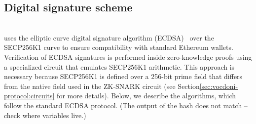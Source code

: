 \subsection{Digital signature scheme}
\label{sec:cryptographic-primitives:signatures}

{}\\

\noi \Davinci uses the {elliptic curve digital signature algorithm} (ECDSA)~\cite{johnson2001ecdsa} over the SECP256K1 curve to ensure compatibility with standard Ethereum wallets. %
%
%
Verification of ECDSA signatures is performed inside zero-knowledge proofs using a specialized circuit that emulates SECP256K1 arithmetic. This approach is necessary because SECP256K1 is defined over a 256-bit prime field that differs from the native field used in the ZK-SNARK circuit (see Section\ref{sec:vocdoni-protocol:circuits} for more details). Below, we describe the algorithms, which follow the standard ECDSA protocol.
%
{\color{blue} (The output of the hash does not match -- check where variables live.)}

